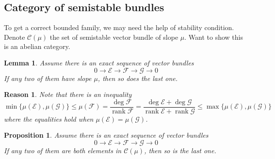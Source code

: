 \documentclass{ctexart}
\newtheorem{proposition}{Proposition}[section]
\newtheorem{lemma}{Lemma}[section]
\newtheorem{reason}{Reason}[section]
\newcommand{\rank}{\operatorname{rank}}
\begin{document}
\subsection{Category of semistable bundles}
\label{subsection:Moduli_Space_of_Vector_Bundles_Category_of_semistable_bundles}

To get a correct bounded family, we may need the help of stability condition.
Denote $\mathscr{C}(\mu)$ the set of semistable vector bundle of slope $\mu$.
Want to show this is an abelian category.
\begin{lemma}
    Assume there is an exact sequence of vector bundles
    \begin{equation}
        0 \longrightarrow \mathcal{E} \longrightarrow \mathcal{F} \longrightarrow \mathcal{G} \longrightarrow 0
    \end{equation}
    If any two of them have slope $\mu$, then so does the last one.
    \label{Lemma 7.15}
\end{lemma}
\begin{reason}
    Note that there is an inequality
    \begin{equation}
        \min \{\mu(\mathcal{E}), \mu(\mathcal{G})\} \le \mu(\mathcal{F}) = \frac{\deg \mathcal{F}}{\rank \mathcal{F}} = \frac{\deg \mathcal{E} + \deg \mathcal{G}}{\rank \mathcal{E} + \rank \mathcal{G}} \le \max \{\mu(\mathcal{E}), \mu(\mathcal{G})\}
    \end{equation}
    where the equalities hold when $\mu(\mathcal{E}) = \mu(\mathcal{G})$.
\end{reason}
\begin{proposition}
    Assume there is an exact sequence of vector bundles
    \begin{equation}
        0 \longrightarrow \mathcal{E} \longrightarrow \mathcal{F} \longrightarrow \mathcal{G} \longrightarrow 0
    \end{equation}
    If any two of them are both elements in $\mathscr{C}(\mu)$, then so is the last one.
    \label{Proposition 7.5}
\end{proposition}
\end{document}
